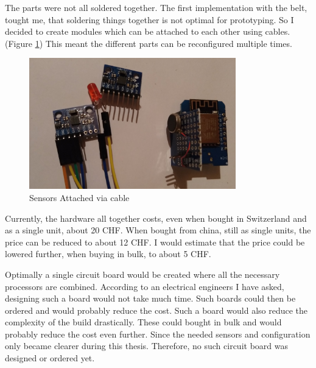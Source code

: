 The parts were not all soldered together. The first implementation with the belt, tought me, that soldering things together is not optimal for prototyping. So I decided to create modules which can be attached to each other using cables. (Figure \ref{fig:SensorsViaCable}) This meant the different parts can be reconfigured multiple times.


\begin{figure}[ht]
  \begin{center}
\includegraphics[width=0.8\textwidth]{images/PluginSensorCable.png}
  \end{center}
  \caption{Sensors Attached via cable}
  \label{fig:SensorsViaCable}
\end{figure}

Currently, the hardware all together costs, even when bought in Switzerland and as a single unit, about 20 CHF. When bought from china, still as single units, the price can be reduced to about 12 CHF. I would estimate that the price could be lowered further, when buying in bulk, to about 5 CHF.

Optimally a single circuit board would be created where all the necessary processors are combined. According to an electrical engineers I have asked, designing such a board would not take much time. Such boards could then be ordered and would probably reduce the cost. Such a board would also reduce the complexity of the build drastically. These could bought in bulk and would probably reduce the cost even further. Since the needed sensors and configuration only became clearer during this thesis. Therefore, no such circuit board was designed or ordered yet.



